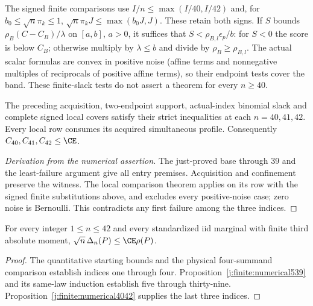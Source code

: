 The signed finite comparisons use $I/n\le\max(I/40,I/42)$ and,
for $b_0\le\sqrt n\pi_k\le1$, $\sqrt n\pi_k J\le\max(b_0J,J)$.
These retain both signs. If $S$ bounds $\rho_B(C-C_B)/\lambda$
on $[a,b]$, $a>0$, it suffices that
$S<\rho_{B,l}\epsilon_p/b$: for $S<0$ the score is below $C_B$;
otherwise multiply by $\lambda\le b$ and divide by
$\rho_B\ge\rho_{B,l}$. The actual scalar formulas are convex in
positive noise (affine terms and nonnegative multiples of reciprocals
of positive affine terms), so their endpoint tests cover the band.
These finite-slack tests do not assert a theorem for every $n\ge40$.

\begin{proposition}\label{j:finite:numerical4042}
The preceding acquisition, two-endpoint support, actual-index binomial
slack and complete signed local covers satisfy their strict inequalities
at each $n=40,41,42$. Every local row consumes its acquired simultaneous
profile. Consequently $C_{40},C_{41},C_{42}\le\CE$.
\end{proposition}
\begin{proof}[Derivation from the numerical assertion]
The just-proved base through 39 and the least-failure argument give
all entry premises. Acquisition and confinement preserve the witness.
The local comparison theorem applies on its row with the signed finite
substitutions above, and excludes every positive-noise case; zero noise
is Bernoulli. This contradicts any first failure among the three indices.
\end{proof}

\begin{theorem}\label{j:finite:base}
For every integer $1\le n\le42$ and every standardized iid marginal
with finite third absolute moment, $\sqrt n\,\Delta_n(P)\le\CE\rho(P)$.
\end{theorem}
\begin{proof}
The quantitative starting bounds and the physical four-summand comparison
establish indices one through four. Proposition~\ref{j:finite:numerical539}
and its same-law induction establish five through thirty-nine.
Proposition~\ref{j:finite:numerical4042} supplies the last three indices.
\end{proof}
